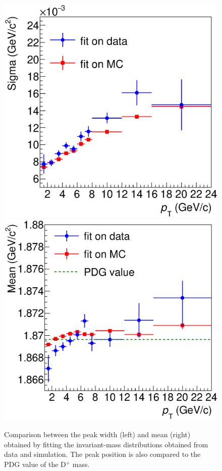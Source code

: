 \documentclass[b5paper,10pt,twoside,oldstyle,classica]{toptesi}
\begin{document}
\begin{figure}[tb]
\begin{center}
{\includegraphics[scale = 0.3]{SigmaComparisonKF.eps}}
\hspace{0cm}
{\includegraphics[scale = 0.3]{MeanComparisonKF.eps}}
\caption{Comparison between the peak width (left) and mean (right) obtained by fitting the invariant-mass distributions obtained from data and simulation. The peak position is also compared to the PDG value of the D$^+$ mass.}
\label{KF_sigmameanComp}
\end{center}
\end{figure} 
\end{document}

